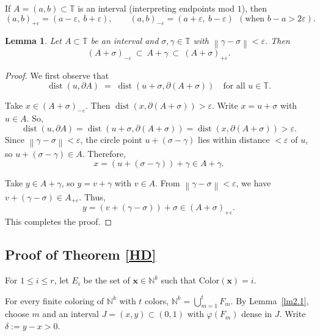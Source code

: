 \documentclass[11pt]{article}
\newtheorem{lemma}[theorem]{Lemma}
\newcommand{\dist}{\operatorname{dist}}
\newcommand{\nnorm}[1]{\left\|#1\right\|}
\theoremstyle{definition}
\newcommand{\T}{\mathbb T}
\begin{document}
If $A=(a,b)\subset\T$ is an interval (interpreting endpoints mod $1$), then
\[
(a,b)_{+\varepsilon}=(a-\varepsilon,\ b+\varepsilon),
\qquad
(a,b)_{-\varepsilon}=(a+\varepsilon,\ b-\varepsilon)\ \ (\text{when }b-a>2\varepsilon).
\]

\begin{lemma}\label{lm2.3}
Let $A\subset\T$ be an interval and $\sigma,\gamma\in\T$ with $\nnorm{\gamma-\sigma}<\varepsilon$. Then
\[
(A+\sigma)_{-\varepsilon}\ \subset\ A+\gamma\ \subset\ (A+\sigma)_{+\varepsilon}.
\]
\end{lemma}

\begin{proof}
We first observe that
\[
\dist(u,\partial A)\;=\;\dist(u+\sigma,\partial(A+\sigma))\quad\text{for all }u\in\T.
\]

Take $x\in(A+\sigma)_{-\varepsilon}$. Then $\dist(x,\partial(A+\sigma))>\varepsilon$.
Write $x=u+\sigma$ with $u\in A$. So,
\[
\dist(u,\partial A)=\dist(u+\sigma,\partial(A+\sigma))=\dist(x,\partial(A+\sigma))>\varepsilon.
\]
Since $\nnorm{\gamma-\sigma}<\varepsilon$, the circle point $u+(\sigma-\gamma)$ lies within distance $<\varepsilon$ of $u$,
so $u+(\sigma-\gamma)\in A$. Therefore,
\[
x=(u+(\sigma-\gamma))+\gamma\in A+\gamma.
\]

Take $y\in A+\gamma$, so $y=v+\gamma$ with $v\in A$. From $\nnorm{\gamma-\sigma}<\varepsilon$, we have $v+(\gamma-\sigma)\in A_{+\varepsilon}$. Thus,
\[
y=(v+(\gamma-\sigma))+\sigma\in (A+\sigma)_{+\varepsilon}.
\]
This completes the proof.
\end{proof}

\subsection{Proof of Theorem \ref{HD}}
For $1\le i\le r$, let $E_i$ be the set of $\mathbf{x}\in \mathbb{N}^k$ such that $\mathrm{Color}(\mathbf{x})=i$.

For every finite coloring of $\mathbb{N}^k$ with $t$ colors, $\mathbb N^k=\bigcup_{m=1}^t F_m$. By Lemma~\ref{lm2.1}, choose $m$ and an interval
$J=(x,y)\subset(0,1)$ with $\varphi(F_m)$ dense in $J$. Write $\delta:=y-x>0$.
\end{document}
